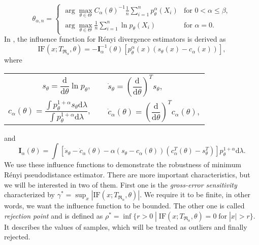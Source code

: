 {\begin{equation}
	\theta_{\alpha,n} =
	\begin{cases}
		\displaystyle{ \arg \max_{\theta \in \Theta} C_\alpha\left( \theta \right)^{-1} \frac{1}{n} \sum_{i=1}^n p_{\theta}^{\alpha}\left( X_i \right) } & \text{for } 0 < \alpha \leq \beta, \\
		\displaystyle{ \arg \max_{\theta \in \Theta}  \frac{1}{n} \sum_{i=1}^n \ln p_{\theta}\left( X_i \right) } & \text{for } \alpha = 0.
	\end{cases}	
	\label{JK-Renyi-estimator_formula}
\end{equation}
In \cite{Vajda2009}, the influence function for R\'{e}nyi divergence estimators is derived as
\begin{equation}
\mathrm{IF}(x;T_{\mathfrak{R}_\alpha},\theta) = -\mathbf{I}^{-1}_{\alpha}(\theta) \left[ p_\theta^\alpha(x) (s_\theta (x) - c_\alpha (x)) \right], \label{JK-IF}
\end{equation}
where
\begin{center}
\begin{tabular}{r l}
$s_\theta = \dfrac{\mathrm{d}}{\mathrm{d}\theta} \ln p_\theta, \quad$ & $ \dot{s}_\theta = \left( \dfrac{\mathrm{d}}{\mathrm{d}\theta} \right)^T s_\theta,$ \\
$c_\alpha(\theta) = \dfrac{\int p_\theta^{1+\alpha}s_\theta \mathrm{d}\lambda}{\int p_\theta^{1+\alpha} \mathrm{d}\lambda}, \quad$ & $\dot{c}_\alpha(\theta)= \left( \dfrac{\mathrm{d}}{\mathrm{d}\theta} \right)^T c_\alpha(\theta),$  \\
\end{tabular}
\end{center}
and
\begin{equation}
\mathbf{I}_{\alpha}(\theta) = \int{ \left[\dot{s}_\theta - \dot{c}_\alpha(\theta) - \alpha(s_\theta - c_\alpha(\theta))(c^T_\alpha(\theta) - s^T_\theta) \right] p_\theta^{1+\alpha} \mathrm{d}\lambda}.
\end{equation}
%
We use these influence functions to demonstrate the robustness of minimum R\'{e}nyi pseudodistance estimator. There are more important characteristics, but we will be interested in two of them. First one is the \textit{gross-error sensitivity} characterized by $\gamma^* = \sup_x |\mathrm{IF}(x;T_{\mathfrak{R}_\alpha},\theta)|$. We require it to be finite, in other words, we want the influence function to be bounded. The other one is called \textit{rejection point} and is defined as
$\rho^* = \inf\lbrace  r > 0 \; | \; \mathrm{IF}(x;T_{\mathfrak{R}_\alpha},\theta) = 0 \; \mathrm{for} \; |x|> r \rbrace$. It describes the values of samples, which will be treated as outliers and finally rejected.

}
